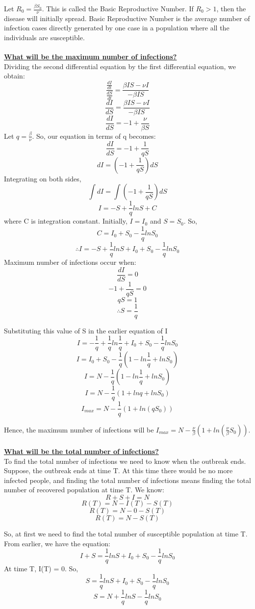 \documentclass[11pt]{article}
\theoremstyle{definition}
\begin{document}
Let $R_0 = \frac{\beta S_0}{\nu}$. This is called the Basic Reproductive Number. If $R_0> 1$, then the disease will initially spread. Basic Reproductive Number is the average number of infection cases directly generated by one case in a population where all the individuals are susceptible.\\
\\
\textbf{\underline{What will be the maximum number of infections?}}\\
Dividing the second differential equation by the first differential equation, we obtain:
$$\frac{\frac{dI}{dt}}{\frac{dS}{dt}}= \frac{\beta I S-\nu I }{-\beta I S}$$
$$\frac{dI}{dS}= \frac{\beta I S-\nu I }{-\beta I S}$$
$$\frac{dI}{dS}=-1 + \frac{\nu }{\beta S}$$
Let $q = \frac{\beta}{\nu}$. So, our equation in terms of q becomes:
$$\frac{dI}{dS}=-1 + \frac{1 }{q S}$$
$$dI = (-1+\frac{1}{qS}) dS$$
Integrating on both sides,
$$\int dI = \int (-1+\frac{1}{qS}) dS$$
$$I = -S + \frac{1}{q}lnS+C$$
where C is integration constant. Initially, $I = I_{0}$ and $S = S_{0}$. So, 
$$C = I_0 + S_0 -\frac{1}{q}lnS_0$$
$$\therefore I = -S + \frac{1}{q}lnS+ I_0 + S_0 -\frac{1}{q}lnS_0$$
Maximum number of infections occur when:
$$\frac{dI}{dS}=0$$
$$-1+\frac{1}{qS}=0$$
$$qS=1$$
$$\therefore S = \frac{1}{q}$$

Substituting this value of S in the earlier equation of I
$$I = -\frac{1}{q} + \frac{1}{q}ln\frac{1}{q}+ I_0 + S_0 -\frac{1}{q}lnS_0$$
$$I = I_0 + S_0 -\frac{1}{q} (1-ln\frac{1}{q}+lnS_0)$$
$$I = N -\frac{1}{q} (1-ln\frac{1}{q}+lnS_0)$$
$$I = N -\frac{1}{q} (1+ln{q}+lnS_0)$$
$$I_{max} = N -\frac{1}{q} (1+ln{(qS_0)})$$

Hence, the maximum number of infections will be $I_{max}=N-\frac{\nu}{\beta}(1+ln(\frac{\nu}{\beta}S_0))$.\\
\\
\textbf{\underline{What will be the total number of infections?}}\\
To find the total number of infections we need to know when the outbreak ends. Suppose, the outbreak ends at time T. At this time there would be no more infected people, and finding the total number of infections means finding the total number of recovered population at time T.
We know: 
$$R+S+I = N$$
$$R(T) = N-I(T)-S(T)$$
$$R(T) = N-0-S(T)$$
$$R(T) = N-S(T)$$

So, at first we need to find the total number of susceptible population at time T.
From earlier, we have the equation:
$$ I + S = \frac{1}{q}lnS+ I_0 + S_0 -\frac{1}{q}lnS_0$$
At time T, I(T) = 0. So,
$$ S = \frac{1}{q}lnS+ I_0 + S_0 -\frac{1}{q}lnS_0$$
$$ S = N + \frac{1}{q}lnS -\frac{1}{q}lnS_0$$
\end{document}
